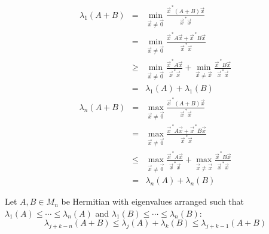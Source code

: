 \documentclass[letterpaper,12pt,fleqn]{article}
\newcommand{\vx}{\vec{x}}
\newcommand{\vxct}{\vx^{\,*}}
\newcommand{\vz}{\vec{0}}
\renewcommand{\l}{\lambda}
\begin{document}
\begin{theproof}
  \listbreak
  \begin{eqnarray*}
    \l_1(A+B) &=& \min_{\vx\ne\vz}\frac{\vxct(A+B)\vx}{\vxct\vx} \\
    &=& \min_{\vx\ne\vz}\frac{\vxct A\vx+\vxct B\vx}{\vxct\vx} \\
    &\ge& \min_{\vx\ne\vz}\frac{\vxct A\vx}{\vxct\vx}+
    \min_{\vx\ne\vx}\frac{\vxct B\vx}{\vxct\vx} \\
    &=& \l_1(A)+\l_1(B)
  \end{eqnarray*}
  \begin{eqnarray*}
    \l_n(A+B) &=& \max_{\vx\ne\vz}\frac{\vxct(A+B)\vx}{\vxct\vx} \\
    &=& \max_{\vx\ne\vz}\frac{\vxct A\vx+\vxct B\vx}{\vxct\vx} \\
    &\le& \max_{\vx\ne\vz}\frac{\vxct A\vx}{\vxct\vx}+
    \max_{\vx\ne\vx}\frac{\vxct B\vx}{\vxct\vx} \\
    &=& \l_n(A)+\l_n(B)
  \end{eqnarray*}
\end{theproof}

\newpage

\begin{theorem}
  Let $A,B\in M_n$ be Hermitian with eigenvalues arranged such that
  $\l_1(A)\le\cdots\le\l_n(A)$ and $\l_1(B)\le\cdots\le\l_n(B)$:
  \[\l_{j+k-n}(A+B)\le\l_j(A)+\l_k(B)\le\l_{j+k-1}(A+B)\]
\end{theorem}
\end{document}
